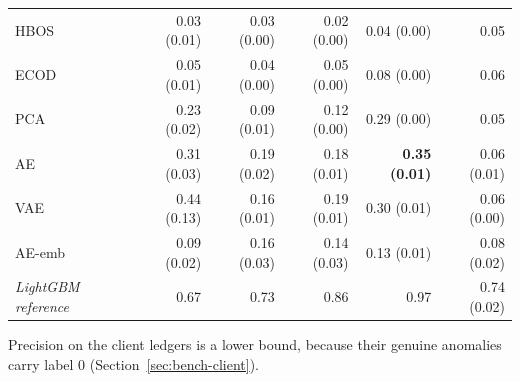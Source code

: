 \begin{table}[tbp]
\begin{tabular}{@{}lrrrrr@{}}
HBOS & 0.03 (0.01) & 0.03 (0.00) & 0.02 (0.00) & 0.04 (0.00) & 0.05 \\
ECOD & 0.05 (0.01) & 0.04 (0.00) & 0.05 (0.00) & 0.08 (0.00) & 0.06 \\
PCA & 0.23 (0.02) & 0.09 (0.01) & 0.12 (0.00) & 0.29 (0.00) & 0.05 \\
AE & 0.31 (0.03) & 0.19 (0.02) & 0.18 (0.01) & \textbf{0.35 (0.01)} & 0.06 (0.01) \\
VAE & 0.44 (0.13) & 0.16 (0.01) & 0.19 (0.01) & 0.30 (0.01) & 0.06 (0.00) \\
AE-emb & 0.09 (0.02) & 0.16 (0.03) & 0.14 (0.03) & 0.13 (0.01) & 0.08 (0.02) \\
\addlinespace
\textit{LightGBM reference} & 0.67 & 0.73 & 0.86 & 0.97 & 0.74 (0.02) \\
\bottomrule
\end{tabular}
\par\smallskip\parbox{\linewidth}{\scriptsize Precision on the client ledgers is a lower bound, because their genuine anomalies carry label 0 (Section~\ref{sec:bench-client}).}
\end{table}
